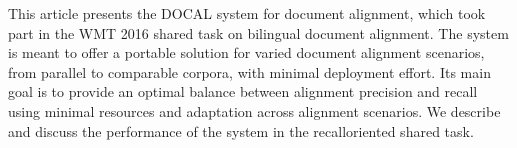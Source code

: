This article presents the DOCAL system for document alignment, which took part in the WMT 2016 shared task on bilingual document alignment. The system is meant to offer a portable solution for varied document alignment scenarios, from parallel to comparable corpora, with minimal deployment effort. Its main goal is to provide an optimal balance between alignment precision and recall using minimal resources and adaptation across alignment scenarios. We describe and discuss the performance of the system in the recalloriented shared task.
